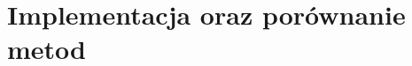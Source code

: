 \begingroup
\newpage
\let\clearpage\relax
\chapter{Implementacja oraz porównanie metod}



\endgroup